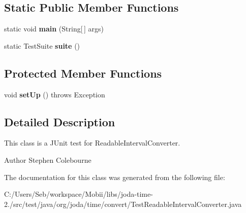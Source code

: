 \subsection*{Static Public Member Functions}
\begin{DoxyCompactItemize}
\item 
\hypertarget{classorg_1_1joda_1_1time_1_1convert_1_1_test_readable_interval_converter_a94a273d77a136c30acc78144c71c285b}{static void {\bfseries main} (String\mbox{[}$\,$\mbox{]} args)}\label{classorg_1_1joda_1_1time_1_1convert_1_1_test_readable_interval_converter_a94a273d77a136c30acc78144c71c285b}

\item 
\hypertarget{classorg_1_1joda_1_1time_1_1convert_1_1_test_readable_interval_converter_acd250d34b035e78898090def0bee1921}{static Test\-Suite {\bfseries suite} ()}\label{classorg_1_1joda_1_1time_1_1convert_1_1_test_readable_interval_converter_acd250d34b035e78898090def0bee1921}

\end{DoxyCompactItemize}
\subsection*{Protected Member Functions}
\begin{DoxyCompactItemize}
\item 
\hypertarget{classorg_1_1joda_1_1time_1_1convert_1_1_test_readable_interval_converter_aa131f4a63355f1f2512b509187efbb06}{void {\bfseries set\-Up} ()  throws Exception }\label{classorg_1_1joda_1_1time_1_1convert_1_1_test_readable_interval_converter_aa131f4a63355f1f2512b509187efbb06}

\end{DoxyCompactItemize}


\subsection{Detailed Description}
This class is a J\-Unit test for Readable\-Interval\-Converter.

\begin{DoxyAuthor}{Author}
Stephen Colebourne 
\end{DoxyAuthor}


The documentation for this class was generated from the following file\-:\begin{DoxyCompactItemize}
\item 
C\-:/\-Users/\-Seb/workspace/\-Mobii/libs/joda-\/time-\/2./src/test/java/org/joda/time/convert/Test\-Readable\-Interval\-Converter.\-java\end{DoxyCompactItemize}
